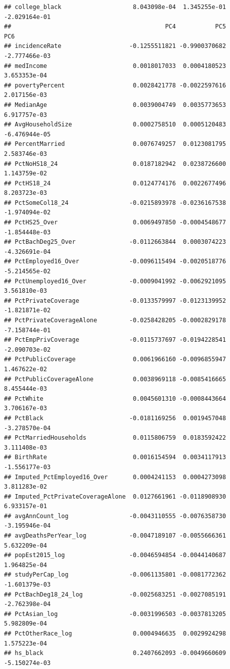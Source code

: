 \documentclass[
  11pt,
]{article}
\begin{document}
\begin{verbatim}
## college_black                    8.043098e-04  1.345255e-01 -2.029164e-01
##                                           PC4           PC5           PC6
## incidenceRate                   -0.1255511821 -0.9900370682 -2.777466e-03
## medIncome                        0.0018017033  0.0004180523  3.653353e-04
## povertyPercent                   0.0028421778 -0.0022597616  2.017156e-03
## MedianAge                        0.0039004749  0.0035773653  6.917757e-03
## AvgHouseholdSize                 0.0002758510  0.0005120483 -6.476944e-05
## PercentMarried                   0.0076749257  0.0123081795  2.583746e-03
## PctNoHS18_24                     0.0187182942  0.0238726600  1.143759e-02
## PctHS18_24                       0.0124774176  0.0022677496  8.203723e-03
## PctSomeCol18_24                 -0.0215893978 -0.0236167538 -1.974094e-02
## PctHS25_Over                     0.0069497850 -0.0004548677 -1.854448e-03
## PctBachDeg25_Over               -0.0112663844  0.0003074223 -4.326691e-04
## PctEmployed16_Over              -0.0096115494 -0.0020518776 -5.214565e-02
## PctUnemployed16_Over            -0.0009041992 -0.0062921095  3.561810e-03
## PctPrivateCoverage              -0.0133579997 -0.0123139952 -1.821871e-02
## PctPrivateCoverageAlone         -0.0258428205 -0.0002829178 -7.158744e-01
## PctEmpPrivCoverage              -0.0115737697 -0.0194228541 -2.090703e-02
## PctPublicCoverage                0.0061966160 -0.0096855947  1.467622e-02
## PctPublicCoverageAlone           0.0038969118 -0.0085416665  8.455444e-03
## PctWhite                         0.0045601310 -0.0008443664  3.706167e-03
## PctBlack                        -0.0181169256  0.0019457048 -3.278570e-04
## PctMarriedHouseholds             0.0115806759  0.0183592422  3.111408e-03
## BirthRate                        0.0016154594  0.0034117913 -1.556177e-03
## Imputed_PctEmployed16_Over       0.0004241153  0.0004273098  3.811283e-02
## Imputed_PctPrivateCoverageAlone  0.0127661961 -0.0118908930  6.933157e-01
## avgAnnCount_log                 -0.0043110555 -0.0076358730 -3.195946e-04
## avgDeathsPerYear_log            -0.0047189107 -0.0055666361  5.632209e-04
## popEst2015_log                  -0.0046594854 -0.0044140687  1.964825e-04
## studyPerCap_log                 -0.0061135801 -0.0081772362 -1.601379e-03
## PctBachDeg18_24_log             -0.0025683251 -0.0027085191 -2.762398e-04
## PctAsian_log                    -0.0031996503 -0.0037813205  5.982809e-04
## PctOtherRace_log                 0.0004946635  0.0029924298  1.575223e-04
## hs_black                         0.2407662093 -0.0049660609 -5.150274e-03

\end{verbatim}
\end{document}
